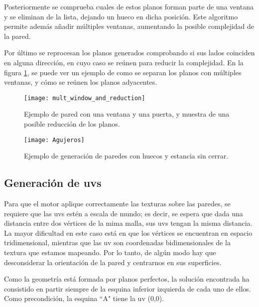 Posteriormente se comprueba cuales de estos planos forman parte de una ventana y se eliminan de la lista, dejando un hueco en dicha posición. Este algoritmo permite además añadir múltiples ventanas, aumentando la posible complejidad de la pared.

Por último se reprocesan los planos generados comprobando si sus lados coinciden en alguna dirección, en cuyo caso se reúnen para reducir la complejidad. En la figura \ref{fig:mult_and_red_windows}, se puede ver un ejemplo de como se separan los planos con múltiples ventanas, y cómo se reúnen los planos adyacentes.

\begin{figure}[H]
    \centering
    \texttt{[image: mult\_window\_and\_reduction]}
    \caption{Ejemplo de pared con una ventana y una puerta, y muestra de una posible reducción de los planos.}
    \label{fig:mult_and_red_windows}
\end{figure}

\begin{figure}[H]
    \centering
    \texttt{[image: Agujeros]}
    \caption{Ejemplo de generación de paredes con huecos y estancia sin cerrar.}
    \label{fig:wall_with_window_example}
\end{figure}

\subsection{Generación de uvs}
Para que el motor aplique correctamente las texturas sobre las paredes, se requiere que las uvs estén a escala de mundo; es decir, se espera que dada una distancia entre dos vértices de la mima malla, sus uvs tengan la misma distancia. La mayor dificultad en este caso está en que los vértices se encuentran en espacio tridimensional, mientras que las uv son coordenadas bidimensionales de la textura que estamos mapeando. Por lo tanto, de algún modo hay que desconsiderar la orientación de la pared y centrarnos en sus superficies.

Como la geometría está formada por planos perfectos, la solución encontrada ha consistido en partir siempre de la esquina inferior izquierda de cada uno de ellos. Como precondición, la esquina ``A" tiene la uv (0,0).

